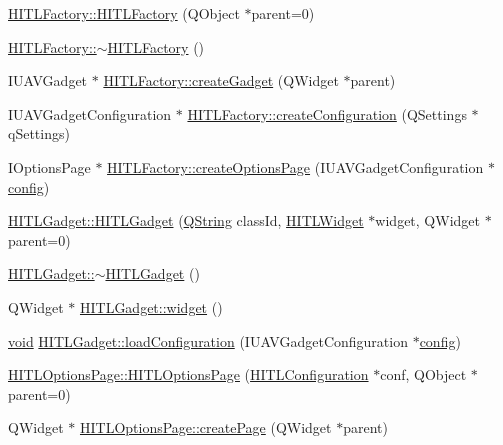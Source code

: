 \begin{DoxyCompactItemize}
\item 
\hyperlink{group___h_i_t_l_plugin_ga855bda20fa1058c99d4d1aa499fe694e}{H\-I\-T\-L\-Factory\-::\-H\-I\-T\-L\-Factory} (Q\-Object $\ast$parent=0)
\item 
\hyperlink{group___h_i_t_l_plugin_ga823205c59cff49942e94bc11bb2c4050}{H\-I\-T\-L\-Factory\-::$\sim$\-H\-I\-T\-L\-Factory} ()
\item 
I\-U\-A\-V\-Gadget $\ast$ \hyperlink{group___h_i_t_l_plugin_ga9a06cbbd0b0cd343e48b0386f1ebe45e}{H\-I\-T\-L\-Factory\-::create\-Gadget} (Q\-Widget $\ast$parent)
\item 
I\-U\-A\-V\-Gadget\-Configuration $\ast$ \hyperlink{group___h_i_t_l_plugin_ga68fed3efae6281089db53d6ea596e331}{H\-I\-T\-L\-Factory\-::create\-Configuration} (Q\-Settings $\ast$q\-Settings)
\item 
I\-Options\-Page $\ast$ \hyperlink{group___h_i_t_l_plugin_ga3064ddee76385734787a3a04e203bac2}{H\-I\-T\-L\-Factory\-::create\-Options\-Page} (I\-U\-A\-V\-Gadget\-Configuration $\ast$\hyperlink{deflate_8c_a4473b5227787415097004fd39f55185e}{config})
\item 
\hyperlink{group___h_i_t_l_plugin_ga2d1233acc508f6fcd25061c0584d1bab}{H\-I\-T\-L\-Gadget\-::\-H\-I\-T\-L\-Gadget} (\hyperlink{group___u_a_v_objects_plugin_gab9d252f49c333c94a72f97ce3105a32d}{Q\-String} class\-Id, \hyperlink{class_h_i_t_l_widget}{H\-I\-T\-L\-Widget} $\ast$widget, Q\-Widget $\ast$parent=0)
\item 
\hyperlink{group___h_i_t_l_plugin_ga92376558188a3a1fdff609f2641758e7}{H\-I\-T\-L\-Gadget\-::$\sim$\-H\-I\-T\-L\-Gadget} ()
\item 
Q\-Widget $\ast$ \hyperlink{group___h_i_t_l_plugin_ga98f16ca8c766c1cd037af671c7f843be}{H\-I\-T\-L\-Gadget\-::widget} ()
\item 
\hyperlink{group___u_a_v_objects_plugin_ga444cf2ff3f0ecbe028adce838d373f5c}{void} \hyperlink{group___h_i_t_l_plugin_gad490d49033c38f3e197628890c342634}{H\-I\-T\-L\-Gadget\-::load\-Configuration} (I\-U\-A\-V\-Gadget\-Configuration $\ast$\hyperlink{deflate_8c_a4473b5227787415097004fd39f55185e}{config})
\item 
\hyperlink{group___h_i_t_l_plugin_ga6f316a1c3e3ee76ad5d8931dbc861194}{H\-I\-T\-L\-Options\-Page\-::\-H\-I\-T\-L\-Options\-Page} (\hyperlink{class_h_i_t_l_configuration}{H\-I\-T\-L\-Configuration} $\ast$conf, Q\-Object $\ast$parent=0)
\item 
Q\-Widget $\ast$ \hyperlink{group___h_i_t_l_plugin_ga82b1534b1cdc2ad63d8849636f64b8c9}{H\-I\-T\-L\-Options\-Page\-::create\-Page} (Q\-Widget $\ast$parent)

\end{DoxyCompactItemize}
